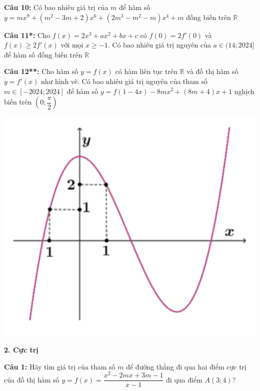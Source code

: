 \documentclass[12pt, a4paper]{article}
\begin{document}
		\textbf{Câu 10: } Có bao nhiêu giá trị của $m$ để hàm số $y=mx^9+(m^2-3m+2)x^6+(2m^3-m^2-m)x^4+m$ đồng biến trên $\mathbb{R}$

		\textbf{Câu 11*: } Cho $f(x)=2x^3+ax^2+bx+c$ có $f(0)=2f'(0)$ và $f(x) \ge 2f'(x)$ với mọi $x \ge -1$. Có bao nhiêu giá trị nguyên của $a \in (14;2024]$ để hàm số đồng biến trên $\mathbb{R}$	

		\textbf{Câu 12**: } Cho hàm số $y=f(x)$ có hàm liên tục trên $\mathbb{R}$ và đồ thị hàm số $y=f'(x)$ như hình vẽ. Có bao nhiêu giá trị nguyên của tham số $m \in [-2024;2024]$ để hàm số ${y=f(1-4x) -8mx^2+(8m+4)x+1}$ nghịch biến trên $\left(0;\dfrac{\pi}{2}\right)$
		
\vspace{-1.2cm}

			\begin{center}
				\includegraphics[scale=0.50]{../images/dondieu_cau12.png}
			\end{center}
			
\vspace{-1.2cm}

				
	\textbf{2. Cực trị}
	
\vspace{-0.2cm}
	
		\textbf{Câu 1:} Hãy tìm giá trị của tham số $m$ để đường thẳng đi qua hai điểm cực trị của đồ thị hàm số $y=f(x)=\dfrac{x^2-2mx+3m-1}{x-1}$ đi qua điểm $A(3;4)$?
		
\end{document}
